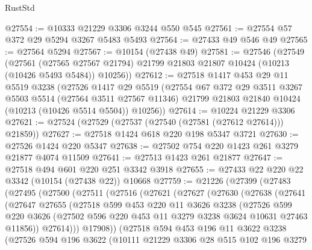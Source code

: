 \begin{lexlean}{RustStd}
\begin{coremodule}
@27554 := @10333 @21229 @3306 @3244 @550 @545
@27561 := @27554 @57 @372 @29 @5294 @3267 @5483 @5493
@27564 := @27433 @49 @546 @49
@27565 := @27564 @5294
@27567 := @10154 (@27438 @49)
@27581 := @27546
    (@27549
      (@27561
        (@27565 @27567 @21794)
        @21799
        @21803
        @21807
        @10424
        (@10213 (@10426 @5493 @5484))
        @10256))
@27612 := @27518
    @1417
    @453
    @29
    @11
    @5519
    @3238
    (@27526
      @1417
      @29
      @5519
      (@27554
        @67
        @372
        @29
        @3511
        @3267
        @5503
        @5514
        (@27564 @3511 @27567 @11346)
        @21799
        @21803
        @21840
        @10424
        (@10213 (@10426 @5514 @5504))
        @10256))
@27614 := @10224 @21229 @3306
@27621 := @27524 (@27529 (@27537 (@27540 (@27581 (@27612 @27614))) @21859))
@27627 := @27518 @1424 @618 @220 @198 @5347 @3721
@27630 := @27526 @1424 @220 @5347
@27638 := @27502 @754 @220 @1423 @261 @3279 @21877 @4074 @11509
@27641 := @27513 @1423 @261 @21877
@27647 := @27518 @494 @601 @220 @251 @3342 @3918
@27655 := @27433 @22 @220 @22 @3342 (@10154 (@27438 @22)) @10668
@27759 := @21226
    (@27399
      (@27483
        (@27495
          (@27500
            (@27511
              (@27516
                (@27621
                  (@27627
                    (@27630
                      (@27638
                        (@27641
                          (@27647
                            @27655
                            (@27518
                              @599
                              @453
                              @220
                              @11
                              @3626
                              @3238
                              (@27526
                                @599
                                @220
                                @3626
                                (@27502 @596 @220 @453 @11 @3279 @3238 @3624 @10631 @27463 @11856))
                              @27614)))
                        @17908))
                    (@27518
                      @594
                      @453
                      @196
                      @11
                      @3622
                      @3238
                      (@27526
                        @594
                        @196
                        @3622
                        (@10111
                          @21229
                          @3306
                          @28
                          @515
                          @102
                          @196
                          @3279

\end{coremodule}
\end{lexlean}
